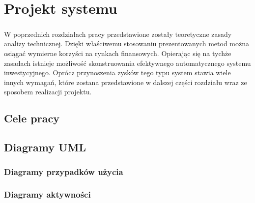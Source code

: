 \documentclass[pdflatex,11pt]{aghdpl}
\begin{document}
\chapter{Projekt systemu}
\label{chap:projekt}
\paragraph{}
W poprzednich rozdziałach pracy przedstawione zostały teoretyczne zasady analizy technicznej. Dzięki właściwemu stosowaniu prezentowanych metod można osiągać wymierne korzyści na rynkach finansowych. Opierając się na tychże zasadach istnieje możliwość skonstruowania efektywnego automatycznego systemu inwestycyjnego. Oprócz przynoszenia zysków tego typu system stawia wiele innych wymagań, które zostana przedstawione w dalszej części rozdziału wraz ze sposobem realizacji projektu.

\section{Cele pracy}
\paragraph{}

\section{Diagramy UML}
\paragraph{}

\subsection{Diagramy przypadków użycia}
\paragraph{}

\subsection{Diagramy aktywności}
\paragraph{}
\end{document}
